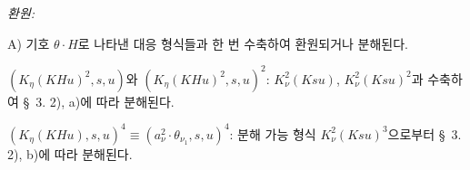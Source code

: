 
\noindent\emph{환원:}

A) 기호 $\theta\cdot H$로 나타낸 대응 형식들과 한 번 수축하여 환원되거나 분해된다.

$(K_\eta(KHu)^2,s,u)$와 $(K_\eta(KHu)^2,s,u)^2$: $K_\nu^2(Ksu)$, $K_\nu^2(Ksu)^2$과 수축하여 \S\ 3. 2), a)에 따라 분해된다.

$(K_\eta(KHu),s,u)^4\equiv(a_\nu^2\cdot\theta_{\nu_1},s,u)^4$: 분해 가능 형식 $K_\nu^2(Ksu)^3$으로부터 \S\ 3. 2), b)에 따라 분해된다.

